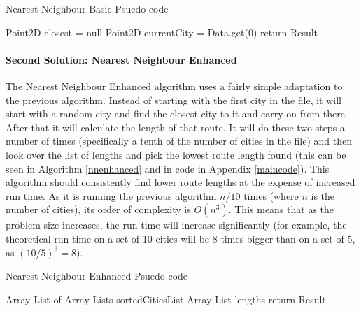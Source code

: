 \documentclass[conference,backref=page]{acmsiggraph}
\begin{document}
\begin{algorithm}[h]
	\caption{Nearest Neighbour Basic Psuedo-code}
	\label{nnbasic}
	Point2D closest = null\;
	Point2D currentCity = Data.get(0)\;
	return Result\;
\end{algorithm}

\paragraph{Second Solution: Nearest Neighbour Enhanced}
The Nearest Neighbour Enhanced algorithm uses a fairly simple adaptation to the previous algorithm. Instead of starting with the first city in the file, it will start with a random city and find the closest city to it and carry on from there. After that it will calculate the length of that route. It will do these two steps a number of times (specifically a tenth of the number of cities in the file) and then look over the list of lengths and pick the lowest route length found (this can be seen in Algorithm \ref{nnenhanced} and in code in Appendix \ref{maincode}). This algorithm should consistently find lower route lengths at the expense of increased run time. As it is running the previous algorithm $n/10$ times (where $n$ is the number of cities), its order of complexity is $O(n^3)$. This means that as the problem size increases, the run time will increase significantly (for example, the theoretical run time on a set of 10 cities will be 8 times bigger than on a set of 5, as $(10/5)^3 = 8$).

\begin{algorithm}[h]
	\caption{Nearest Neighbour Enhanced Psuedo-code}
	\label{nnenhanced}
	Array List of Array Lists sortedCitiesList\;
	Array List lengths\;
	return Result\;
\end{algorithm}
\end{document}
